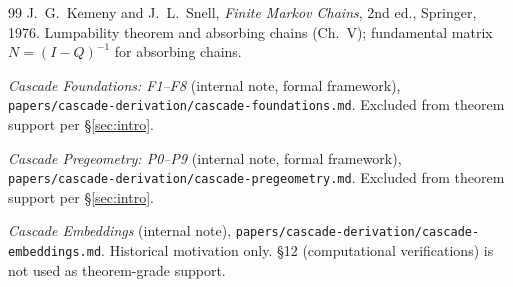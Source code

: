 \documentclass[11pt, a4paper]{amsart}
\theoremstyle{definition}
\begin{document}
\begin{thebibliography}{99}
J.~G.~Kemeny and J.~L.~Snell, \emph{Finite Markov Chains}, 2nd
ed., Springer, 1976. Lumpability theorem and absorbing chains
(Ch.~V); fundamental matrix $N = (I - Q)^{-1}$ for absorbing
chains.

\emph{Cascade Foundations: F1--F8} (internal note, formal
framework), \texttt{papers/cascade-derivation/cascade-foundations.md}.
Excluded from theorem support per \S\ref{sec:intro}.

\emph{Cascade Pregeometry: P0--P9} (internal note, formal
framework), \texttt{papers/cascade-derivation/cascade-pregeometry.md}.
Excluded from theorem support per \S\ref{sec:intro}.

\emph{Cascade Embeddings} (internal note),
\texttt{papers/cascade-derivation/cascade-embeddings.md}.
Historical motivation only. \S 12 (computational verifications)
is not used as theorem-grade support.

\end{thebibliography}
\end{document}
